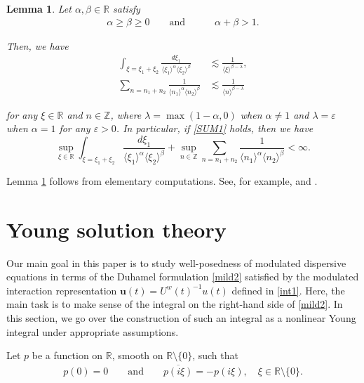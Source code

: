 \documentclass[letterpaper, 11pt,  reqno]{amsart}
\newtheorem{lemma}[theorem]{Lemma}
\newcommand{\1}{\hspace{0.5mm}\text{I}\hspace{0.5mm}}
\newcommand{\noi}{\noindent}
\newcommand{\Z}{\mathbb{Z}}
\newcommand{\R}{\mathbb{R}}
\newcommand{\al}{\alpha}
\newcommand{\be}{\beta}
\newcommand{\eps}{\varepsilon}
\newcommand{\ld}{\lambda}
\newcommand{\cj}{\overline}
\newcommand{\les}{\lesssim}
\newcommand{\jb}[1]
{\langle #1 \rangle}
\newcommand{\uw}{U^w}
\newcommand{\uu}{\mathbf{u}}
\numberwithin{equation}{section}
\numberwithin{theorem}{section}
\begin{document}
\begin{lemma}\label{LEM:SUM}
Let  $\al, \be \in \R$ satisfy
\begin{align}
 \al \ge \be \ge 0 \qquad \text{and}\qquad  \quad \al+ \be > 1.
 \label{SUM1}
\end{align}


\noi
Then, we have
\begin{align*}
\int_{\xi = \xi_1 + \xi_2}\frac{d\xi_1}{\jb{\xi_1}^\al \jb{\xi_2}^\be}
& \les \frac 1{\jb{\xi}^{ \be - \ld}}, \\
 \sum_{n = n_1 + n_2} \frac{1}{\jb{n_1}^\al \jb{n_2}^\be}
& \les \frac 1{\jb{n}^{ \be - \ld}}
\end{align*}

\noi
for any $\xi \in \R$ and $n \in \Z$, 
where $\ld = 
\max( 1- \al, 0)$ when $\al\ne 1$ and $\ld = \eps$ when $\al = 1$ for any $\eps > 0$.
In particular, if \eqref{SUM1} holds, then we have 
\[
\sup_{\xi  \in \R} \int_{\xi = \xi_1 + \xi_2}\frac{d\xi_1}{\jb{\xi_1}^\al \jb{\xi_2}^\be}
+ 
\sup_{n \in \Z} \sum_{n = n_1 + n_2} \frac{1}{\jb{n_1}^\al \jb{n_2}^\be}
< \infty. \]


\end{lemma}


Lemma \ref{LEM:SUM} follows
from elementary  computations.
See, for example,  
 \cite[Lemma 4.2]{GTV} and \cite[Lemma 4.1]{MWX}.










\section{Young solution theory}
\label{SEC:Young}





Our main goal in this paper is to study well-posedness of 
modulated dispersive equations
in terms of the Duhamel formulation \eqref{mild2} satisfied
by the modulated interaction representation
$\uu(t)=\uw(t)^{-1}u(t)$ defined in \eqref{int1}.
Here,  the main task is to make sense of 
 the integral 
on the right-hand side of \eqref{mild2}.
In this section, we go over the construction of
such an integral as a  nonlinear Young integral
under appropriate assumptions.



Let $p$ be a function on $\R$, smooth on $\R \setminus\{0\}$, 
such that  
\begin{align}
p(0) = 0\qquad 
\text{and}\qquad 
\cj{p(i\xi)} = - p(i\xi), \quad \xi \in \R\setminus \{0\}.
\label{X0a}
\end{align}
\end{document}
